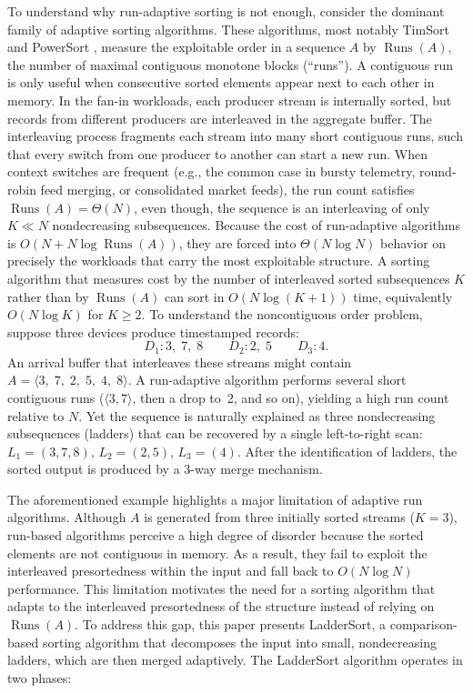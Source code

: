 \documentclass{ieeeaccess}
\theoremstyle{plain}
\theoremstyle{definition}
\DeclareMathOperator{\Runs}{Runs}
\begin{document}
To understand why run-adaptive sorting is not enough, consider the dominant family of adaptive sorting algorithms.  These algorithms, most notably TimSort \cite{Auger2018} and PowerSort \cite{MunroWild2018}, measure the exploitable order in a sequence $A$ by $\Runs(A)$, the number of maximal contiguous monotone blocks (``runs''). A contiguous run is only useful when consecutive sorted elements appear next to each other in memory. In the fan-in workloads, each producer stream is internally sorted, but records from different producers are interleaved in the aggregate buffer. The interleaving process fragments each stream into many short contiguous runs, such that every switch from one producer to another can start a new run. When context switches are frequent (e.g., the common case in bursty telemetry, round-robin feed merging, or consolidated market feeds), the run count satisfies $\Runs(A) = \Theta(N)$, even though, the sequence is an interleaving of only $K \ll N$ nondecreasing subsequences. Because the cost of run-adaptive algorithms is $O(N + N\log\Runs(A))$, they are forced into $\Theta(N\log N)$ behavior on precisely the workloads that carry the most exploitable structure. A sorting algorithm that measures cost by the number of interleaved sorted subsequences $K$ rather than by $\Runs(A)$ can sort in $O(N\log(K+1))$ time, equivalently $O(N\log K)$ for $K \ge 2$. To understand the noncontiguous order problem, suppose three devices produce timestamped records:
\[
  D_1: 3,\;7,\;8 \qquad
  D_2: 2,\;5     \qquad
  D_3: 4.
\]
An arrival buffer that interleaves these streams might contain $A = \langle 3,\;7,\;2,\;5,\;4,\;8 \rangle$. A run-adaptive algorithm performs several short contiguous runs ($\langle 3,7 \rangle$, then a drop to~2, and so on), yielding a high run count relative to $N$.  Yet the sequence is naturally explained as three nondecreasing subsequences (ladders) that can be recovered by a single left-to-right scan: $L_1 = (3,7,8)$, $L_2 = (2,5)$, $L_3 = (4)$. After the identification of ladders, the sorted output is produced by a 3-way merge mechanism. 

The aforementioned example highlights a major limitation of adaptive run algorithms. Although $A$ is generated from three initially sorted streams ($K=3$), run-based algorithms perceive a high degree of disorder because the sorted elements are not contiguous in memory. As a result, they fail to exploit the interleaved presortedness within the input and fall back to $O(N \log N)$ performance. This limitation motivates the need for a sorting algorithm that adapts to the interleaved presortedness of the structure instead of relying on $\Runs(A)$. To address this gap, this paper presents LadderSort, a comparison-based sorting algorithm that decomposes the input into small, nondecreasing ladders, which are then merged adaptively. The LadderSort algorithm operates in two phases:
\end{document}
